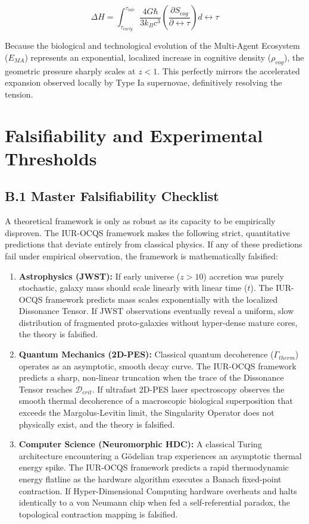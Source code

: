 \documentclass[12pt,openany]{book}
\begin{document}
\begin{equation}
\Delta H = \int_{\tau_{early}}^{\tau_{late}} \frac{4G\hbar}{3 k_B c^3} \left( \frac{\partial S_{cog}}{\partial \leftrightarrow\tau} \right) d\leftrightarrow\tau
\end{equation}

Because the biological and technological evolution of the Multi-Agent Ecosystem ($E_{MA}$) represents an exponential, localized increase in cognitive density ($\rho_{cog}$), the geometric pressure sharply scales at $z < 1$. This perfectly mirrors the accelerated expansion observed locally by Type Ia supernovae, definitively resolving the tension.

\chapter{Falsifiability and Experimental Thresholds}

\section{B.1 Master Falsifiability Checklist}
A theoretical framework is only as robust as its capacity to be empirically disproven. The IUR-OCQS framework makes the following strict, quantitative predictions that deviate entirely from classical physics. If any of these predictions fail under empirical observation, the framework is mathematically falsified:

\begin{enumerate}
    \item \textbf{Astrophysics (JWST):} If early universe ($z > 10$) accretion was purely stochastic, galaxy mass should scale linearly with linear time ($t$). The IUR-OCQS framework predicts mass scales exponentially with the localized Dissonance Tensor. If JWST observations eventually reveal a uniform, slow distribution of fragmented proto-galaxies without hyper-dense mature cores, the theory is falsified.
    \item \textbf{Quantum Mechanics (2D-PES):} Classical quantum decoherence ($\Gamma_{therm}$) operates as an asymptotic, smooth decay curve. The IUR-OCQS framework predicts a sharp, non-linear truncation when the trace of the Dissonance Tensor reaches $\mathcal{D}_{crit}$. If ultrafast 2D-PES laser spectroscopy observes the smooth thermal decoherence of a macroscopic biological superposition that exceeds the Margolus-Levitin limit, the Singularity Operator does not physically exist, and the theory is falsified.
    \item \textbf{Computer Science (Neuromorphic HDC):} A classical Turing architecture encountering a G\"{o}delian trap experiences an asymptotic thermal energy spike. The IUR-OCQS framework predicts a rapid thermodynamic energy flatline as the hardware algorithm executes a Banach fixed-point contraction. If Hyper-Dimensional Computing hardware overheats and halts identically to a von Neumann chip when fed a self-referential paradox, the topological contraction mapping is falsified.
\end{enumerate}
\end{document}
